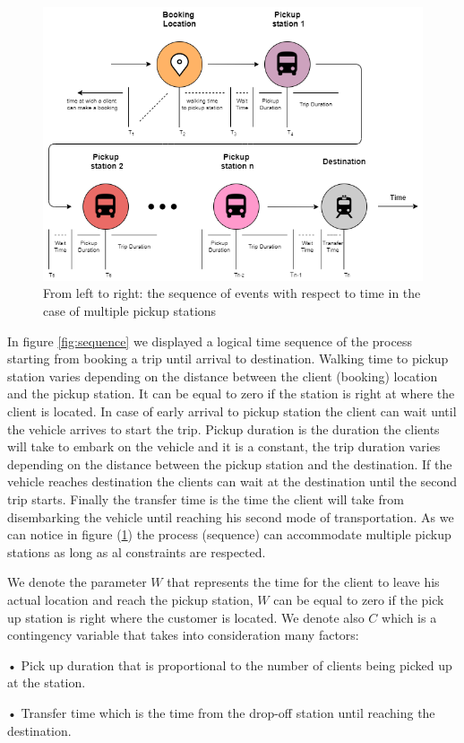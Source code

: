 \documentclass{article}
\begin{document}
\begin{figure}[H]
    \centering 
  \includegraphics[width=\linewidth]{pictures/time_sequence_with_manystations}
  \caption{From left to right: the sequence of events with respect to time in the case of multiple pickup stations}
\label{fig:sequence2}
\end{figure}

In figure \ref{fig:sequence} we displayed a logical time sequence of the process starting from booking a trip until arrival to destination. Walking time to pickup station varies depending on the distance between the client (booking) location and the 
pickup station. It can be equal to zero if the station is right at where the client is located. In case of early arrival to pickup station the client can wait until the vehicle arrives to start the trip. Pickup duration is the duration the clients will take to embark 
on the vehicle and it is a constant, the trip duration varies depending on the distance between the pickup station and the destination. If the vehicle reaches destination the clients can wait at the destination until the second trip starts. Finally the transfer time 
is the time the client will take from disembarking the vehicle until reaching his second mode of transportation. As we can notice in figure (\ref{fig:sequence2}) the process (sequence) can accommodate multiple pickup stations as long as al constraints are respected.

We denote the parameter $W$ that represents the time for the client to leave his actual location and reach the pickup station, $W$ can be equal to zero if the pick up station is right where the 
customer is located. We denote also $C$ which is a contingency variable that takes into consideration many factors: \\
\begin{list}{}
\item •  Pick up duration that is proportional to the number of clients being picked up at the station.
\item •  Transfer time which is the time from the drop-off station until reaching the destination.
\end{list} 
\end{document}
